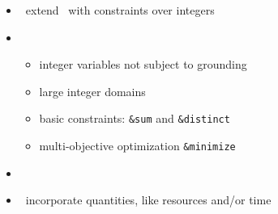 \begin{frame}{\clingcon}
  \begin{itemize}
  \item {} \ extend \clingo\ with constraints over integers
  \item {} \
    \begin{itemize}
    \item integer variables not subject to grounding
    \item large integer domains
    \item basic constraints: \lstinline{&sum} and \lstinline{&distinct}
    \item multi-objective optimization \lstinline{&minimize}
    \end{itemize}
  \item {} \ \cite{bakaossc16a}
  \item {} \ incorporate quantities, like resources and/or time
  \end{itemize}
\end{frame}
%
